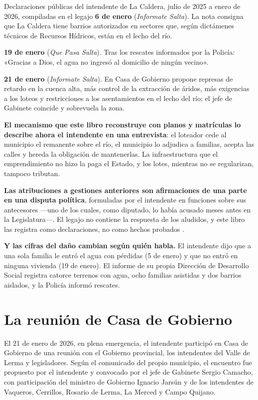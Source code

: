 \begin{ficha}{Declaraciones públicas del intendente de La Caldera, julio de 2025 a enero de 2026, compiladas en el legajo}
\textbf{6 de enero} (\textit{Informate Salta}). La nota consigna que La Caldera tiene barrios autorizados en sectores que, según dictámenes técnicos de Recursos Hídricos, están en el lecho del río.

\textbf{19 de enero} (\textit{Que Pasa Salta}). Tras los rescates informados por la Policía: «Gracias a Dios, el agua no ingresó al domicilio de ningún vecino».

\textbf{21 de enero} (\textit{Informate Salta}). En Casa de Gobierno propone represas de retardo en la cuenca alta, más control de la extracción de áridos, más exigencias a los loteos y restricciones a los asentamientos en el lecho del río; el jefe de Gabinete coincide y sobrevuela la zona.
\end{ficha}

\begin{cautela}
\textbf{El mecanismo que este libro reconstruye con planos y matrículas lo describe ahora el intendente en una entrevista}: el loteador cede al municipio el remanente sobre el río, el municipio lo adjudica a familias, acepta las calles y hereda la obligación de mantenerlas. La infraestructura que el emprendimiento no hizo la paga el Estado, y los lotes, mientras no se regularizan, tampoco tributan.

\textbf{Las atribuciones a gestiones anteriores son afirmaciones de una parte en una disputa política}, formuladas por el intendente en funciones sobre sus antecesores ---uno de los cuales, como diputado, lo había acusado meses antes en la Legislatura---. El legajo no contiene la respuesta de los aludidos, y este libro las registra como declaraciones, no como hechos probados .

\textbf{Y las cifras del daño cambian según quién habla.} El intendente dijo que a una sola familia le entró el agua con pérdidas (5 de enero) y que no entró en ninguna vivienda (19 de enero). El informe de su propia Dirección de Desarrollo Social registra catorce terrenos con agua, ocho familias asistidas y dos barrios aislados, y la Policía informó rescates.
\end{cautela}

\section{La reunión de Casa de Gobierno}

El 21 de enero de 2026, en plena emergencia, el intendente participó en Casa de Gobierno de una reunión con el Gobierno provincial, los intendentes del Valle de Lerma y legisladores. Según el comunicado del propio municipio, el encuentro fue propuesto por el intendente y convocado por el jefe de Gabinete Sergio Camacho, con participación del ministro de Gobierno Ignacio Jarsún y de los intendentes de Vaqueros, Cerrillos, Rosario de Lerma, La Merced y Campo Quijano.

